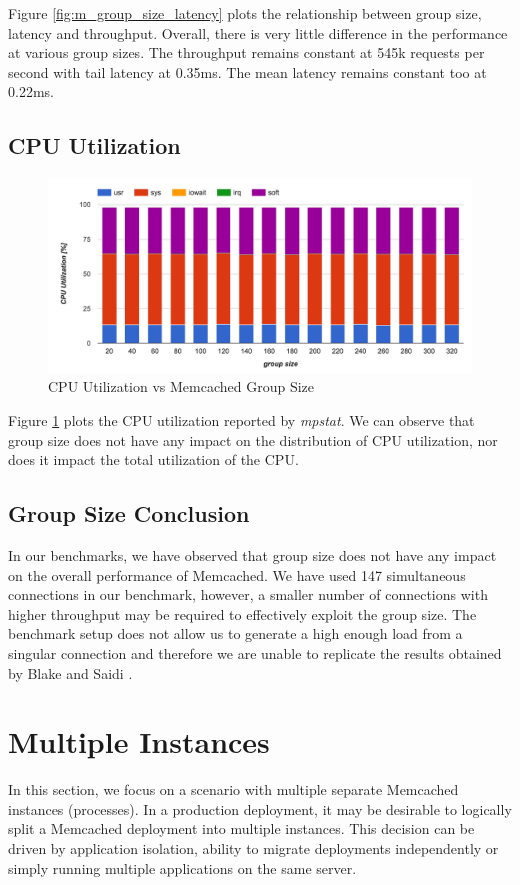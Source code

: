 Figure \ref{fig:m_group_size_latency} plots the relationship between group size, latency and throughput. Overall, there is very little difference in the performance at various group sizes. The throughput remains constant at 545k requests per second with tail latency at 0.35ms. The mean latency remains constant too at 0.22ms.

\subsection{CPU Utilization}

\begin{figure}[h]
    \includegraphics[width=\textwidth]{./res2/m_group_size_cpu.png}
    \caption{CPU Utilization vs Memcached Group Size}
    \label{fig:m_group_size_cpu}
\end{figure}

Figure \ref{fig:m_group_size_cpu} plots the CPU utilization reported by \textit{mpstat}. We can observe that group size does not have any impact on the distribution of CPU utilization, nor does it impact the total utilization of the CPU.

\subsection{Group Size Conclusion}
In our benchmarks, we have observed that group size does not have any impact on the overall performance of Memcached. We have used 147 simultaneous connections in our benchmark, however, a smaller number of connections with higher throughput may be required to effectively exploit the group size. The benchmark setup does not allow us to generate a high enough load from a singular connection and therefore we are unable to replicate the results obtained by Blake and Saidi \cite{blake54does}.


\section{Multiple Instances}
\label{sec:m_multiple_instances}
In this section, we focus on a scenario with multiple separate Memcached instances (processes). In a production deployment, it may be desirable to logically split a Memcached deployment into multiple instances. This decision can be driven by application isolation, ability to migrate deployments independently or simply running multiple applications on the same server.

